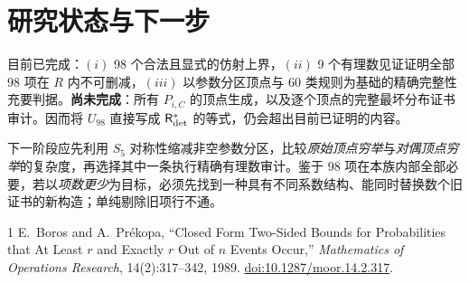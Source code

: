 \documentclass[11pt,a4paper]{ctexart}
\theoremstyle{definition}
\newcommand{\Risk}{\mathsf R}
\begin{document}
\section{研究状态与下一步}
目前已完成：$(i)$ 98 个合法且显式的仿射上界，$(ii)$ 9 个有理数见证证明全部 98 项在 $R$ 内不可删减，$(iii)$ 以参数分区顶点与 $60$ 类规则为基础的精确完整性充要判据。\textbf{尚未完成}：所有 $P_{i,C}$ 的顶点生成，以及逐个顶点的完整最坏分布证书审计。因而将 $U_{98}$ 直接写成 $\Risk_{\rm det}^*$ 的等式，仍会超出目前已证明的内容。

下一阶段应先利用 $S_5$ 对称性缩减非空参数分区，比较\emph{原始顶点穷举}与\emph{对偶顶点穷举}的复杂度，再选择其中一条执行精确有理数审计。鉴于 98 项在本族内部全部必要，若以\emph{项数更少}为目标，必须先找到一种具有不同系数结构、能同时替换数个旧证书的新构造；单纯剔除旧项行不通。

\begin{thebibliography}{1}
 E.~Boros and A.~Pr\'ekopa, ``Closed Form Two-Sided Bounds for Probabilities that At Least $r$ and Exactly $r$ Out of $n$ Events Occur,'' \emph{Mathematics of Operations Research}, 14(2):317--342, 1989. \href{https://doi.org/10.1287/moor.14.2.317}{doi:10.1287/moor.14.2.317}.
\end{thebibliography}

\appendix
\end{document}
